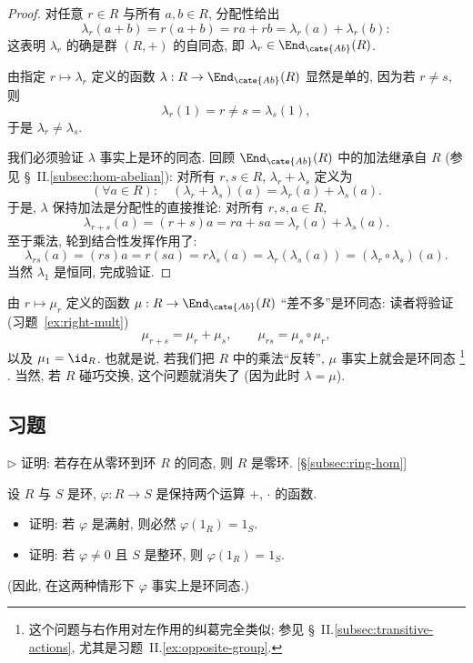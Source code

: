 \begin{proof}
对任意 $r \in R$ 与所有 $a, b \in R$, 分配性给出
\[
\lambda_r(a + b) = r(a + b) = ra + rb = \lambda_r(a) + \lambda_r(b):
\]
这表明 $\lambda_r$ 的确是群 $(R, +)$ 的自同态, 即 $\lambda_r \in \End_{\cate{Ab}}(R)$.

由指定 $r \mapsto \lambda_r$ 定义的函数 $\lambda : R \to \End_{\cate{Ab}}(R)$ 显然是单的, 因为若 $r \neq s$, 则
\[
\lambda_r(1) = r \neq s = \lambda_s(1),
\]
于是 $\lambda_r \neq \lambda_s$.

我们必须验证 $\lambda$ 事实上是环的同态. 回顾 $\End_{\cate{Ab}}(R)$ 中的加法继承自 $R$ (参见 \S~II.\ref{subsec:hom-abelian}): 对所有 $r, s \in R$, $\lambda_r + \lambda_s$ 定义为
\[
(\forall a \in R): \quad (\lambda_r + \lambda_s)(a) = \lambda_r(a) + \lambda_s(a).
\]
于是, $\lambda$ 保持加法是分配性的直接推论: 对所有 $r, s, a \in R$,
\[
\lambda_{r+s}(a) = (r+s)a = ra + sa = \lambda_r(a) + \lambda_s(a).
\]
至于乘法, 轮到结合性发挥作用了:
\[
\lambda_{rs}(a) = (rs)a = r(sa) = r\lambda_s(a) = \lambda_r(\lambda_s(a)) = (\lambda_r \circ \lambda_s)(a).
\]
当然 $\lambda_1$ 是恒同, 完成验证.
\end{proof}

由 $r \mapsto \mu_r$ 定义的函数 $\mu : R \to \End_{\cate{Ab}}(R)$ ``差不多''是环同态: 读者将验证 (习题~\ref{ex:right-mult})
\[
\mu_{r+s} = \mu_r + \mu_s, \qquad \mu_{rs} = \mu_s \circ \mu_r,
\]
以及 $\mu_1 = \id_R$. 也就是说, 若我们把 $R$ 中的乘法``反转'', $\mu$ 事实上就会是环同态%
\footnote{这个问题与右作用对左作用的纠葛完全类似; 参见 \S~II.\ref{subsec:transitive-actions}, 尤其是习题~II.\ref{ex:opposite-group}.}%
. 当然, 若 $R$ 碰巧交换, 这个问题就消失了 (因为此时 $\lambda = \mu$).

\subsection*{习题}
{}

\begin{prob}
\label{ex:zero-ring-hom}
$\triangleright$ 证明: 若存在从零环到环 $R$ 的同态, 则 $R$ 是零环. [\S\ref{subsec:ring-hom}]
\end{prob}

\begin{prob}
\label{ex:surjective-preserves-1}
设 $R$ 与 $S$ 是环, $\varphi : R \to S$ 是保持两个运算 $+$, $\cdot$ 的函数.
\begin{itemize}
	\item 证明: 若 $\varphi$ 是满射, 则必然 $\varphi(1_R) = 1_S$.
	\item 证明: 若 $\varphi \neq 0$ 且 $S$ 是整环, 则 $\varphi(1_R) = 1_S$.
\end{itemize}
(因此, 在这两种情形下 $\varphi$ 事实上是环同态.)
\end{prob}

